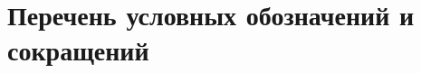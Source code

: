 \documentclass[a4paper,14pt]{extreport}
\begin{document}
\maketitle

{
  \renewcommand{\contentsname}{ОГЛАВЛЕНИЕ}
  \tableofcontents
}

\chapter*{Перечень условных обозначений и сокращений}











\end{document}
